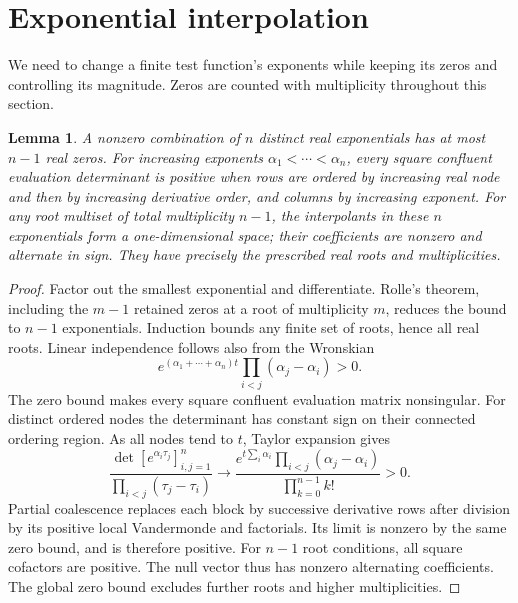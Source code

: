\documentclass[11pt]{article}
\newtheorem{lemma}[theorem]{Lemma}
\theoremstyle{remark}
\begin{document}
\section{Exponential interpolation}\label{sec:interpolation}

We need to change a finite test function's exponents while keeping its zeros
and controlling its magnitude. Zeros are counted with multiplicity throughout
this section.

\begin{lemma}\label{lem:chebyshev}
A nonzero combination of $n$ distinct real exponentials has at most $n-1$
real zeros. For increasing exponents $\alpha_1<\cdots<\alpha_n$, every
square confluent evaluation determinant is positive when rows are ordered
by increasing real node and then by increasing derivative order, and columns
by increasing exponent. For any root multiset of total multiplicity $n-1$,
the interpolants in these $n$ exponentials form a one-dimensional space;
their coefficients are nonzero and alternate in sign. They have precisely
the prescribed real roots and multiplicities.
\end{lemma}
\begin{proof}
Factor out the smallest exponential and differentiate. Rolle's theorem,
including the $m-1$ retained zeros at a root of multiplicity $m$, reduces the
bound to $n-1$ exponentials. Induction bounds any finite set of roots, hence
all real roots. Linear independence follows also from the Wronskian
\[
 e^{(\alpha_1+\cdots+\alpha_n)t}
             \prod_{i<j}(\alpha_j-\alpha_i)>0.
\]
The zero bound makes every square confluent evaluation matrix nonsingular.
For distinct ordered nodes the determinant has constant sign on their
connected ordering region. As all nodes tend to $t$, Taylor expansion gives
\[
 \frac{\det[e^{\alpha_i\tau_j}]_{i,j=1}^n}
      {\prod_{i<j}(\tau_j-\tau_i)}
 \longrightarrow
 \frac{e^{t\sum_i\alpha_i}\prod_{i<j}(\alpha_j-\alpha_i)}
      {\prod_{k=0}^{n-1}k!}>0.
\]
Partial coalescence replaces each block by successive derivative rows after
division by its positive local Vandermonde and factorials. Its limit is
nonzero by the same zero bound, and is therefore positive. For $n-1$ root
conditions, all square cofactors are positive. The null vector thus has
nonzero alternating coefficients. The global zero bound excludes further
roots and higher multiplicities.
\end{proof}
\end{document}
